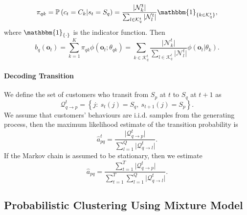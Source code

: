 \begin{equation}
\pi_{qk} = \mathbb{P} \left( c_t = C_k | s_t = S_q \right) = \frac{\vert \mathcal{N}_k^t \vert}{\sum_{l \in \mathcal{K}_q^t} \vert \mathcal{N}_l^t \vert} \mathbbm{1}_{\{ k \in \mathcal{K}_q^t \}},
\end{equation}
where $\mathbbm{1}_{\{\cdot\}}$ is the indicator function. Then
\begin{equation}
b_q (\mathbf{o}_t) = \sum_{k=1}^K \pi_{qk} \phi(\mathbf{o}_t ; \theta_{qk}) = \sum_{ k \in \mathcal{K}_q^t } \frac{\vert \mathcal{N}_k^t \vert}{\sum_{l \in \mathcal{K}_q^t} \vert \mathcal{N}_l^t \vert} \phi(\mathbf{o}_t | \theta_{k}).
\end{equation}

\paragraph*{Decoding Transition}

We define the set of customers who transit from $S_p$ at $t$ to $S_q$ at $t+1$ as
\begin{equation}
\mathcal{Q}_{q \rightarrow p}^t = \left\lbrace j: ~s_t(j) = S_q, ~s_{t+1}(j) = S_p \right\rbrace.
\end{equation}
We assume that customers' behaviours are i.i.d. samples from the generating process, then the maximum likelihood estimate of the transition probability is
\begin{equation}
\hat{a}^t_{pq} = \frac{\vert \mathcal{Q}_{q \rightarrow p}^t \vert}{\sum_{l=1}^Q \vert \mathcal{Q}_{q \rightarrow l}^t \vert}.
\end{equation}
If the Markov chain is assumed to be stationary, then we estimate
\begin{equation}
\hat{a}_{pq} = \frac{\sum_{t=1}^T \vert \mathcal{Q}_{q \rightarrow p}^t \vert}{\sum_{t=1}^T \sum_{l=1}^Q \vert \mathcal{Q}_{q \rightarrow l}^t \vert}.
\end{equation}

\subsection{Probabilistic Clustering Using Mixture Model}
\label{sec:mixtureModel}

